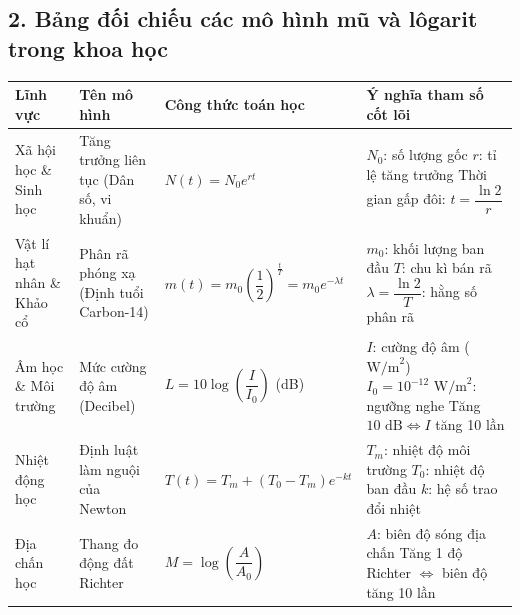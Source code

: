 \documentclass[12pt, a4paper]{article}
\begin{document}
\vspace{5pt}

\subsection*{2. Bảng đối chiếu các mô hình mũ và lôgarit trong khoa học}

\begin{center}
\begin{tabularx}{\textwidth}{|>{\centering\arraybackslash}p{2.5cm}|>{\centering\arraybackslash}p{4cm}|>{\centering\arraybackslash}X|>{\centering\arraybackslash}X|}
\hline
\textbf{Lĩnh vực} & \textbf{Tên mô hình} & \textbf{Công thức toán học} & \textbf{Ý nghĩa tham số cốt lõi} \\
\hline
Xã hội học \& Sinh học & Tăng trưởng liên tục (Dân số, vi khuẩn) & $N(t) = N_0 e^{rt}$ & $N_0$: số lượng gốc \newline $r$: tỉ lệ tăng trưởng \newline Thời gian gấp đôi: $t = \dfrac{\ln 2}{r}$ \\
\hline
Vật lí hạt nhân \& Khảo cổ & Phân rã phóng xạ (Định tuổi Carbon-14) & $m(t) = m_0 \left(\dfrac{1}{2}\right)^{\frac{t}{T}} = m_0 e^{-\lambda t}$ & $m_0$: khối lượng ban đầu \newline $T$: chu kì bán rã \newline $\lambda = \dfrac{\ln 2}{T}$: hằng số phân rã \\
\hline
Âm học \& Môi trường & Mức cường độ âm (Decibel) & $L = 10 \log\left(\dfrac{I}{I_0}\right)$ (dB) & $I$: cường độ âm ($\text{W/m}^2$) \newline $I_0 = 10^{-12}\text{ W/m}^2$: ngưỡng nghe \newline Tăng $10\text{ dB} \iff I$ tăng 10 lần \\
\hline
Nhiệt động học & Định luật làm nguội của Newton & $T(t) = T_m + (T_0 - T_m)e^{-kt}$ & $T_m$: nhiệt độ môi trường \newline $T_0$: nhiệt độ ban đầu \newline $k$: hệ số trao đổi nhiệt \\
\hline
Địa chấn học & Thang đo động đất Richter & $M = \log\left(\dfrac{A}{A_0}\right)$ & $A$: biên độ sóng địa chấn \newline Tăng 1 độ Richter $\iff$ biên độ tăng 10 lần \\
\hline
\end{tabularx}
\end{center}

\vspace{5pt}
\end{document}
